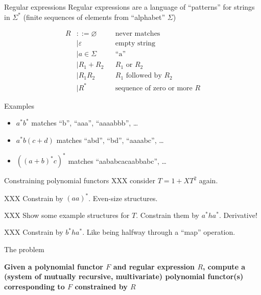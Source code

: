 \documentclass[xcolor=svgnames,12pt]{beamer}
\newcommand{\realt}{+}
\newenvironment{xframe}[1][]
  {\begin{frame}[fragile,environment=xframe,#1]}
  {\end{frame}}
\begin{document}
\begin{xframe}{Regular expressions}
  Regular expressions are a language of ``patterns'' for strings in
  $\Sigma^*$ (finite sequences of elements from ``alphabet'' $\Sigma$)

  \begin{align*}
    R &::= \varnothing && \text{never matches} \\
    &\mid \varepsilon && \text{empty string} \\
    &\mid a \in \Sigma && \text{``a''} \\
    &\mid R_1 \realt R_2 && \text{$R_1$ or $R_2$} \\
    &\mid R_1R_2 && \text{$R_1$ followed by $R_2$} \\
    &\mid R^* && \text{sequence of zero or more $R$}
  \end{align*}
\end{xframe}

\begin{xframe}{Examples}
  \begin{itemize}
  \item $a^*b^*$ \quad matches ``b'', ``aaa'', ``aaaabbb'', \dots
  \item $a^* b (c+d)$ \quad matches ``abd'', ``bd'', ``aaaabc'', \dots
  \item $((a+b)^*c)^*$ \quad matches ``aababcacaabbabc'', \dots
  \end{itemize}
\end{xframe}

\begin{xframe}{Constraining polynomial functors}
  XXX consider $T = 1 + XT^2$ again.

  XXX Constrain by $(aa)^*$.  Even-size structures.
\end{xframe}

\begin{xframe}
  XXX Show some example structures for $T$.  Constrain them by
  $a^*ha^*$.  Derivative!
\end{xframe}

\begin{xframe}
  XXX Constrain by $b^*ha^*$.  Like being halfway through a ``map''
  operation.
\end{xframe}

\begin{xframe}{The problem}
  \begin{center}
  \textbf{Given a polynomial functor $F$ and regular expression $R$, compute
  a (system of mutually recursive, multivariate) polynomial functor(s)
  corresponding to $F$ constrained by $R$}
  \end{center}
\end{xframe}
\end{document}
